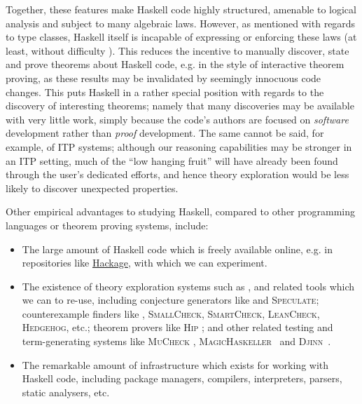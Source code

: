 Together, these features make Haskell code highly structured, amenable to
logical analysis and subject to many algebraic laws. However, as mentioned with
regards to type classes, Haskell itself is incapable of expressing or enforcing
these laws (at least, without difficulty \cite{lindley2014hasochism}). This
reduces the incentive to manually discover, state and prove theorems about
Haskell code, e.g. in the style of interactive theorem proving, as these results
may be invalidated by seemingly innocuous code changes. This puts Haskell in a
rather special position with regards to the discovery of interesting theorems;
namely that many discoveries may be available with very little work, simply
because the code's authors are focused on \emph{software} development rather
than \emph{proof} development. The same cannot be said, for example, of ITP
systems; although our reasoning capabilities may be stronger in an ITP setting,
much of the ``low hanging fruit'' will have already been found through the
user's dedicated efforts, and hence theory exploration would be less likely to
discover unexpected properties.

Other empirical advantages to studying Haskell, compared to other programming
languages or theorem proving systems, include:

\begin{itemize}
\item The large amount of Haskell code which is freely available online, e.g. in
  repositories like \href{http://hackage.haskell.org}{Hackage}, with which we
  can experiment.

\item The existence of theory exploration systems such as \hspec{}, and related
  tools which we can to re-use, including conjecture generators like \qspec{}
  and \textsc{Speculate}; counterexample finders like \qcheck{}, \textsc{SmallCheck},
  \textsc{SmartCheck}, \textsc{LeanCheck}, \textsc{Hedgehog}, etc.; theorem
  provers like \textsc{Hip} \cite{rosen2012proving}; and other related testing
  and term-generating systems like \textsc{MuCheck} \cite{le2014mucheck},
  \textsc{MagicHaskeller}~\cite{katayama2011magichaskeller} and
  \textsc{Djinn}~\cite{augustsson2005djinn}.

\item The remarkable amount of infrastructure which exists for working with
  Haskell code, including package managers, compilers, interpreters, parsers,
  static analysers, etc.
\end{itemize}

